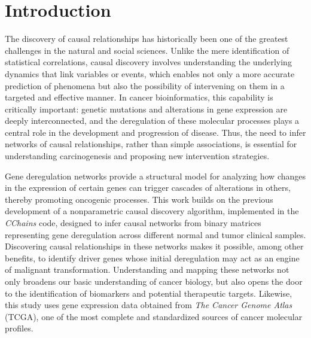 \documentclass[12pt,a4paper]{report}
\begin{document}
\newpage

\tableofcontents
\listoffigures
\listoftables
\newpage



\chapter*{Introduction}

The discovery of causal relationships has historically been one of the greatest challenges in the natural and social sciences. Unlike the mere identification of statistical correlations, causal discovery involves understanding the underlying dynamics that link variables or events, which enables not only a more accurate prediction of phenomena but also the possibility of intervening on them in a targeted and effective manner\cite{pearl}. In cancer bioinformatics, this capability is critically important: genetic mutations and alterations in gene expression are deeply interconnected, and the deregulation of these molecular processes plays a central role in the development and progression of disease\cite{cascades}. Thus, the need to infer networks of causal relationships, rather than simple associations, is essential for understanding carcinogenesis and proposing new intervention strategies\cite{causcorr}.

Gene deregulation networks provide a structural model for analyzing how changes in the expression of certain genes can trigger cascades of alterations in others, thereby promoting oncogenic processes\cite{cascades}. This work builds on the previous development of a nonparametric causal discovery algorithm, implemented in the \textit{CChains} code\cite{parametric}, designed to infer causal networks from binary matrices representing gene deregulation across different normal and tumor clinical samples. Discovering causal relationships in these networks makes it possible, among other benefits, to identify driver genes whose initial deregulation may act as an engine of malignant transformation. Understanding and mapping these networks not only broadens our basic understanding of cancer biology, but also opens the door to the identification of biomarkers and potential therapeutic targets\cite{biomarkers}. Likewise, this study uses gene expression data obtained from \textit{The Cancer Genome Atlas} (TCGA), one of the most complete and standardized sources of cancer molecular profiles\cite{prad,luad,lusc}.
\end{document}
